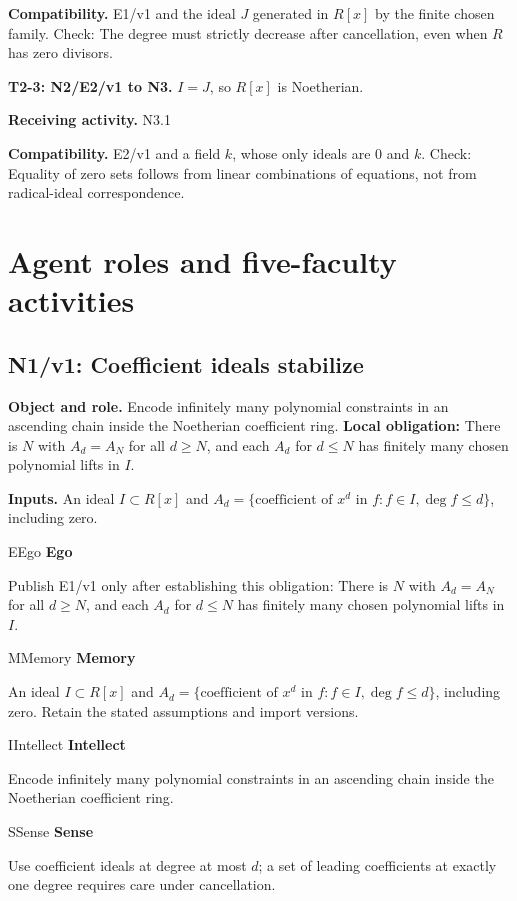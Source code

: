 \documentclass[preprint,12pt,aps,pra,showkeys,amsmath,amssymb,superscriptaddress,floatfix]{revtex4-2}
\theoremstyle{definition}
\theoremstyle{remark}
\newcommand{\mmfaculty}[3]{%
 \begin{mmfacultybox}{#1}{#2}
 {\sffamily\bfseries\color{MMBlue}#2}\par\smallskip #3
 \end{mmfacultybox}}
\newcommand{\field}[2]{\par\smallskip\noindent\textbf{#1.} #2\par}
\begin{document}
\field{Compatibility}{E1/v1 and the ideal \(J\) generated in \(R[x]\) by the finite chosen
family. Check: The degree must strictly decrease after cancellation,
even when \(R\) has zero divisors.}

\field{T2-3: N2/E2/v1 to N3}{\(I=J\), so \(R[x]\) is Noetherian.}

\field{Receiving activity}{N3.1}

\field{Compatibility}{E2/v1 and a field \(k\), whose only ideals are \(0\) and \(k\). Check:
Equality of zero sets follows from linear combinations of equations, not
from radical-ideal correspondence.}

\endgroup

\clearpage\section{Agent roles and five-faculty activities}\begingroup\small\linespread{1.05}\selectfont{}

\subsection{N1/v1: Coefficient ideals stabilize}

\field{Object and role}{Encode infinitely many polynomial constraints in an ascending chain
inside the Noetherian coefficient ring. \textbf{Local obligation:} There
is \(N\) with \(A_d=A_N\) for all \(d\ge N\), and each \(A_d\) for
\(d\le N\) has finitely many chosen polynomial lifts in \(I\).}

\field{Inputs}{An ideal \(I\subset R[x]\) and
\(A_d=\{\text{coefficient of }x^d\text{ in }f:f\in I,\deg f\le d\}\),
including zero.}

\mmfaculty{E}{Ego}{Publish E1/v1 only after establishing this obligation: There is \(N\)
with \(A_d=A_N\) for all \(d\ge N\), and each \(A_d\) for \(d\le N\) has
finitely many chosen polynomial lifts in \(I\).}

\mmfaculty{M}{Memory}{An ideal \(I\subset R[x]\) and
\(A_d=\{\text{coefficient of }x^d\text{ in }f:f\in I,\deg f\le d\}\),
including zero. Retain the stated assumptions and import versions.}

\mmfaculty{I}{Intellect}{Encode infinitely many polynomial constraints in an ascending chain
inside the Noetherian coefficient ring.}

\mmfaculty{S}{Sense}{Use coefficient ideals at degree at most \(d\); a set of leading
coefficients at exactly one degree requires care under cancellation.}
\end{document}
